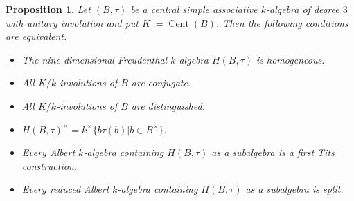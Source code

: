 \documentclass{amsart}
\newtheorem{prop}[equation]{Proposition}
\theoremstyle{definition} %
\theoremstyle{remark} %
\DeclareMathOperator{\Cent}{Cent}
\renewcommand{\:}{\colon\,}
\numberwithin{equation}{section}
\begin{document}
\begin{prop} \label{p.HOMDIS}
Let $(B,\tau)$ be a central simple associative $k$-algebra of degree $3$ with unitary involution and put $K := \Cent(B)$. Then the following conditions are equivalent.
\begin{itemize}
    \item[(i)] The nine-dimensional Freudenthal $k$-algebra $H(B,\tau)$ is homogeneous. 	
\item[(ii)] All $K/k$-involutions of $B$ are conjugate.  
\item[(iii)] All $K/k$-involutions of $B$ are distinguished.
\item[(iv)] $H(B,\tau)^{\times}=k^{\times}\{b\tau(b)|b\in B^{\times}\}$.
\item[(v)] Every Albert $k$-algebra containing $H(B,\tau)$ as a subalgebra is a first Tits construction.
\item[(vi)] Every reduced Albert $k$-algebra containing $H(B,\tau)$ as a subalgebra is split.

\end{itemize}
\end{prop}
\end{document}
